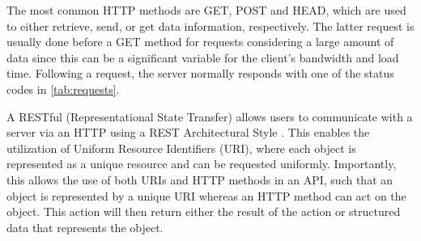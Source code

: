 \begin{table}[!ht]
\centering
\caption{Numeric status code for response. The leftmost digit decides the type of response, while the two follow-up digits depend on the implemented API.}
\label{tab:requests}
\noindent{}
\end{table}

\noindent The most common HTTP methods are GET, POST and HEAD, which are used to either retrieve, send, or get data information, respectively. The latter request is usually done before a GET method for requests considering a large amount of data since this can be a significant variable for the client's bandwidth and load time. Following a request, the server normally responds with one of the status codes in \autoref{tab:requests}.



A RESTful (Representational State Transfer) allows users to communicate with a server via an HTTP using a REST Architectural Style \cite{Battle2008}. This enables the utilization of Uniform Resource Identifiers (URI), where each object is represented as a unique resource and can be requested uniformly. Importantly, this allows the use of both URIs and HTTP methods in an API, such that an object is represented by a unique URI whereas an HTTP method can act on the object. This action will then return either the result of the action or structured data that represents the object.



